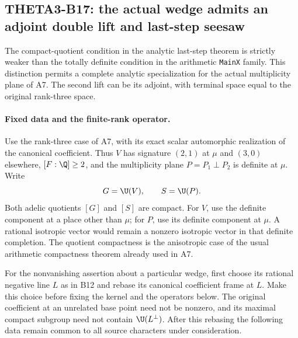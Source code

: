 \subsection{THETA3-B17: the actual wedge admits an adjoint double lift and last-step seesaw}\label{B17}

The compact-quotient condition in the analytic last-step theorem is
strictly weaker than the totally definite condition in the arithmetic
\texttt{MainX} family. This distinction permits a complete analytic
specialization for the actual multiplicity plane of A7. The second
lift can be its adjoint, with terminal space equal to the original
rank-three space.

\paragraph{Fixed data and the finite-rank operator.}
Use the rank-three case of A7, with its exact scalar automorphic
realization of the canonical coefficient. Thus $V$ has signature
$(2,1)$ at $\mu$ and $(3,0)$ elsewhere, $[F:\Q]\geq2$, and the
multiplicity plane $P=P_1\perp P_2$ is definite at $\mu$.
Write
\[
 G=\U(V),\qquad S=\U(P).
\]
Both adelic quotients $[G]$ and $[S]$ are compact. For $V$, use
the definite component at a place other than $\mu$; for $P$, use
its definite component at $\mu$. A rational isotropic vector would
remain a nonzero isotropic vector in that definite completion.
The quotient compactness is the anisotropic case of the usual
arithmetic compactness theorem already used in A7.

For the nonvanishing assertion about a particular wedge, first
choose its rational negative line $L$ as in B12 and rebase its
canonical coefficient frame at $L$. Make this choice before
fixing the kernel and the operators below. The original
coefficient at an unrelated base point need not be nonzero,
and its maximal compact subgroup need not contain $\U(L^\perp)$.
After this rebasing the following data remain common to all
source characters under consideration.

